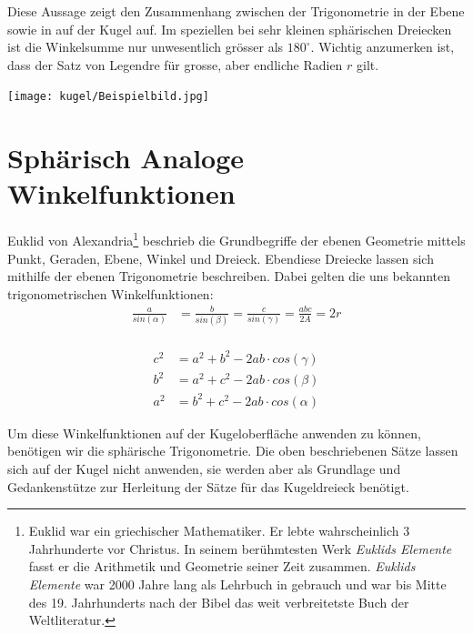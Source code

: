 \begin{refsection}
Diese Aussage zeigt den Zusammenhang zwischen der 
Trigonometrie in der Ebene sowie in auf der Kugel
auf. Im speziellen bei sehr kleinen sphärischen 
Dreiecken ist die Winkelsumme nur unwesentlich 
grösser als $180^{\circ}$. 
Wichtig anzumerken ist, dass der Satz von Legendre 
für grosse, aber endliche Radien $r$ gilt.

\begin{center}
        \texttt{[image: kugel/Beispielbild.jpg]}
\end{center}


\section{Sphärisch Analoge Winkelfunktionen}
Euklid von Alexandria\footnote{%
Euklid war ein griechischer Mathematiker. Er lebte wahrscheinlich 3 Jahrhunderte vor Christus. In seinem berühmtesten Werk \textit{Euklids Elemente} fasst er die Arithmetik und Geometrie seiner Zeit zusammen. \textit{Euklids Elemente} war 2000 Jahre lang als Lehrbuch in gebrauch und war bis Mitte des 19. Jahrhunderts nach der Bibel das weit verbreitetste Buch der Weltliteratur.}  beschrieb die Grundbegriffe der ebenen Geometrie mittels Punkt, Geraden, Ebene, Winkel und Dreieck. Ebendiese Dreiecke lassen sich mithilfe der ebenen Trigonometrie beschreiben. Dabei gelten die uns bekannten trigonometrischen Winkelfunktionen:\\

\begin{align*}
\frac{ a }{ sin(\alpha) } &= \frac{ b }{sin(\beta)} = \frac{ c }{ sin(\gamma) } = \frac{abc}{2A} = 2r\\
\end{align*}

\begin{align*}
c^{ 2 } &= a^{ 2 } + b^{ 2 } - 2ab\cdot cos(\gamma)\\
b^{ 2 } &= a^{ 2 } + c^{ 2 } - 2ab\cdot cos(\beta)\\
a^{ 2 } &= b^{ 2 } + c^{ 2 } - 2ab\cdot cos(\alpha)
\end{align*}

Um diese Winkelfunktionen auf der Kugeloberfläche anwenden zu können, benötigen wir die sphärische Trigonometrie. Die oben beschriebenen Sätze lassen sich auf der Kugel nicht anwenden, sie werden aber als Grundlage und Gedankenstütze zur Herleitung der Sätze für das Kugeldreieck benötigt.


\end{refsection}
